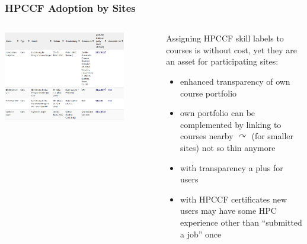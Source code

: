 \begin{frame}
  \frametitle{HPCCF Adoption by Sites}
  \begin{columns}
   \begin{column}{0.5\textwidth}
    \centering
    \includegraphics[width=0.8\textwidth]{images/linking_skills}\\
   \end{column}
   \begin{column}{0.5\textwidth}
     Assigning HPCCF skill labels to courses is without cost, yet they are an asset for participating sites:
     \begin{itemize}
      \item enhanced transparency of own course portfolio
      \item own portfolio can be complemented by linking to courses nearby $\curvearrowright$ (for smaller sites) not so thin anymore
      \item with transparency a plus for users
      \item with HPCCF certificates new users may have some HPC experience other than ``submitted a job'' once
     \end{itemize}
   \end{column}
  \end{columns}
\end{frame}


